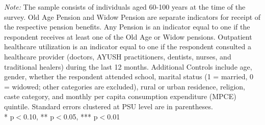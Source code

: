 \documentclass[
  11pt,
]{article}
\begin{document}
\begin{landscape}
\begin{table}[H]
\centering
\vspace{1.8mm}
\caption{Outpatient Healthcare Utilization and Pension}
\label{tab:outpatient}
\vspace{3mm}
\vspace{2mm}
\begin{minipage}{0.95\textwidth}
\footnotesize \textit{Note:} The sample consists of individuals aged 60-100 years at the time of the survey. Old Age Pension and Widow Pension are separate indicators for receipt of the respective pension benefits. Any Pension is an indicator equal to one if the respondent receives at least one of the Old Age or Widow pensions. Outpatient healthcare utilization is an indicator equal to one if the respondent consulted a healthcare provider (doctors, AYUSH practitioners, dentists, nurses, and traditional healers) during the last 12 months. Additional Controls include age, gender, whether the respondent attended school, marital status (1 = married, 0 = widowed; other categories are excluded), rural or urban residence, religion, caste category, and monthly per capita consumption expenditure (MPCE) quintile. Standard errors clustered at PSU level are in parentheses. \\ * p$<$0.10, ** p$<$0.05, *** p$<$0.01\\

\end{minipage}
\end{table}
\end{landscape}
\end{document}
